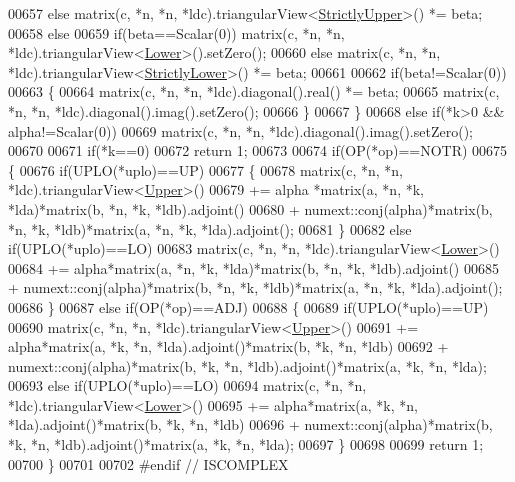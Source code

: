 \begin{DoxyCode}
00657       \textcolor{keywordflow}{else}                matrix(c, *n, *n, *ldc).triangularView<\hyperlink{group__enums_gga39e3366ff5554d731e7dc8bb642f83cdae38aad7d66fecfb213fce453edff4c7a}{StrictlyUpper}>() *= beta;
00658     \textcolor{keywordflow}{else}
00659       \textcolor{keywordflow}{if}(beta==Scalar(0)) matrix(c, *n, *n, *ldc).triangularView<\hyperlink{group__enums_gga39e3366ff5554d731e7dc8bb642f83cda891792b8ed394f7607ab16dd716f60e6}{Lower}>().setZero();
00660       \textcolor{keywordflow}{else}                matrix(c, *n, *n, *ldc).triangularView<\hyperlink{group__enums_gga39e3366ff5554d731e7dc8bb642f83cda00aa79c8865ada1584c4d57bcd93299f}{StrictlyLower}>() *= beta;
00661 
00662     \textcolor{keywordflow}{if}(beta!=Scalar(0))
00663     \{
00664       matrix(c, *n, *n, *ldc).diagonal().real() *= beta;
00665       matrix(c, *n, *n, *ldc).diagonal().imag().setZero();
00666     \}
00667   \}
00668   \textcolor{keywordflow}{else} \textcolor{keywordflow}{if}(*k>0 && alpha!=Scalar(0))
00669     matrix(c, *n, *n, *ldc).diagonal().imag().setZero();
00670 
00671   \textcolor{keywordflow}{if}(*k==0)
00672     \textcolor{keywordflow}{return} 1;
00673 
00674   \textcolor{keywordflow}{if}(OP(*op)==NOTR)
00675   \{
00676     \textcolor{keywordflow}{if}(UPLO(*uplo)==UP)
00677     \{
00678       matrix(c, *n, *n, *ldc).triangularView<\hyperlink{group__enums_gga39e3366ff5554d731e7dc8bb642f83cda6bcb58be3b8b8ec84859ce0c5ac0aaec}{Upper}>()
00679         +=            alpha *matrix(a, *n, *k, *lda)*matrix(b, *n, *k, *ldb).adjoint()
00680         +  numext::conj(alpha)*matrix(b, *n, *k, *ldb)*matrix(a, *n, *k, *lda).adjoint();
00681     \}
00682     \textcolor{keywordflow}{else} \textcolor{keywordflow}{if}(UPLO(*uplo)==LO)
00683       matrix(c, *n, *n, *ldc).triangularView<\hyperlink{group__enums_gga39e3366ff5554d731e7dc8bb642f83cda891792b8ed394f7607ab16dd716f60e6}{Lower}>()
00684         += alpha*matrix(a, *n, *k, *lda)*matrix(b, *n, *k, *ldb).adjoint()
00685         +  numext::conj(alpha)*matrix(b, *n, *k, *ldb)*matrix(a, *n, *k, *lda).adjoint();
00686   \}
00687   \textcolor{keywordflow}{else} \textcolor{keywordflow}{if}(OP(*op)==ADJ)
00688   \{
00689     \textcolor{keywordflow}{if}(UPLO(*uplo)==UP)
00690       matrix(c, *n, *n, *ldc).triangularView<\hyperlink{group__enums_gga39e3366ff5554d731e7dc8bb642f83cda6bcb58be3b8b8ec84859ce0c5ac0aaec}{Upper}>()
00691         +=             alpha*matrix(a, *k, *n, *lda).adjoint()*matrix(b, *k, *n, *ldb)
00692         +  numext::conj(alpha)*matrix(b, *k, *n, *ldb).adjoint()*matrix(a, *k, *n, *lda);
00693     \textcolor{keywordflow}{else} \textcolor{keywordflow}{if}(UPLO(*uplo)==LO)
00694       matrix(c, *n, *n, *ldc).triangularView<\hyperlink{group__enums_gga39e3366ff5554d731e7dc8bb642f83cda891792b8ed394f7607ab16dd716f60e6}{Lower}>()
00695         +=             alpha*matrix(a, *k, *n, *lda).adjoint()*matrix(b, *k, *n, *ldb)
00696         +  numext::conj(alpha)*matrix(b, *k, *n, *ldb).adjoint()*matrix(a, *k, *n, *lda);
00697   \}
00698 
00699   \textcolor{keywordflow}{return} 1;
00700 \}
00701 
00702 \textcolor{preprocessor}{#endif // ISCOMPLEX}
\end{DoxyCode}
